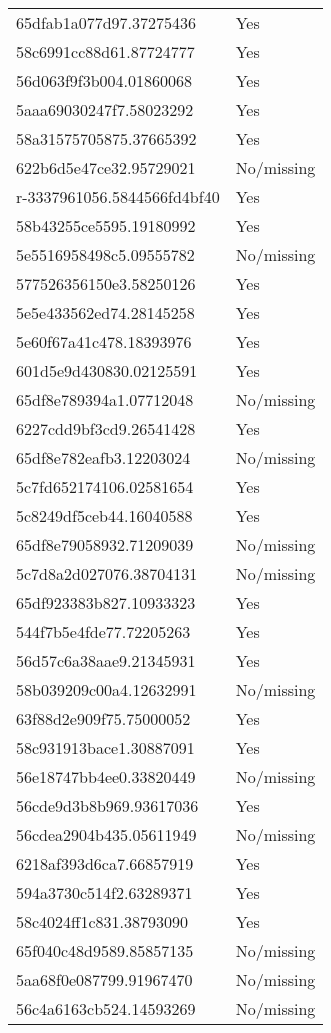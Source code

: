 \begin{tabular}{ll}
65dfab1a077d97.37275436 & Yes \\
58c6991cc88d61.87724777 & Yes \\
56d063f9f3b004.01860068 & Yes \\
5aaa69030247f7.58023292 & Yes \\
58a31575705875.37665392 & Yes \\
622b6d5e47ce32.95729021 & No/missing \\
r-3337961056.5844566fd4bf40 & Yes \\
58b43255ce5595.19180992 & Yes \\
5e5516958498c5.09555782 & No/missing \\
577526356150e3.58250126 & Yes \\
5e5e433562ed74.28145258 & Yes \\
5e60f67a41c478.18393976 & Yes \\
601d5e9d430830.02125591 & Yes \\
65df8e789394a1.07712048 & No/missing \\
6227cdd9bf3cd9.26541428 & Yes \\
65df8e782eafb3.12203024 & No/missing \\
5c7fd652174106.02581654 & Yes \\
5c8249df5ceb44.16040588 & Yes \\
65df8e79058932.71209039 & No/missing \\
5c7d8a2d027076.38704131 & No/missing \\
65df923383b827.10933323 & Yes \\
544f7b5e4fde77.72205263 & Yes \\
56d57c6a38aae9.21345931 & Yes \\
58b039209c00a4.12632991 & No/missing \\
63f88d2e909f75.75000052 & Yes \\
58c931913bace1.30887091 & Yes \\
56e18747bb4ee0.33820449 & No/missing \\
56cde9d3b8b969.93617036 & Yes \\
56cdea2904b435.05611949 & No/missing \\
6218af393d6ca7.66857919 & Yes \\
594a3730c514f2.63289371 & Yes \\
58c4024ff1c831.38793090 & Yes \\
65f040c48d9589.85857135 & No/missing \\
5aa68f0e087799.91967470 & No/missing \\
56c4a6163cb524.14593269 & No/missing \\

\end{tabular}
